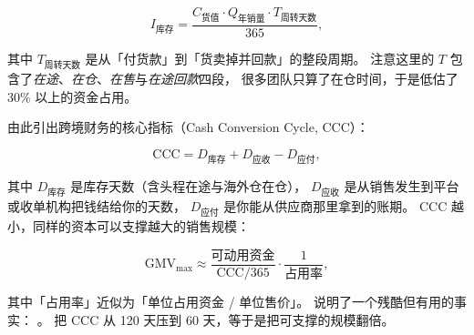 \begin{equation}
I_{\text{库存}} = \frac{C_{\text{货值}} \cdot Q_{\text{年销量}} \cdot T_{\text{周转天数}}}{365} ,
\label{eq:cbec-inventory}
\end{equation}

其中 $T_{\text{周转天数}}$ 是从「付货款」到「货卖掉并回款」的整段周期。
注意这里的 $T$ 包含了\emph{在途}、\emph{在仓}、\emph{在售}与\emph{在途回款}四段，
很多团队只算了在仓时间，于是低估了 30\% 以上的资金占用。

由此引出跨境财务的核心指标（Cash Conversion Cycle, CCC）：

\begin{equation}
\text{CCC} = D_{\text{库存}} + D_{\text{应收}} - D_{\text{应付}} ,
\label{eq:cbec-ccc}
\end{equation}

其中 $D_{\text{库存}}$ 是库存天数（含头程在途与海外仓在仓），
$D_{\text{应收}}$ 是从销售发生到平台或收单机构把钱结给你的天数，
$D_{\text{应付}}$ 是你能从供应商那里拿到的账期。
CCC 越小，同样的资本可以支撑越大的销售规模：

\begin{equation}
\text{GMV}_{\max} \approx \frac{\text{可动用资金}}{\text{CCC}/365} \cdot \frac{1}{\text{占用率}},
\label{eq:cbec-gmvmax}
\end{equation}

其中「占用率」近似为「单位占用资金 / 单位售价」。
 说明了一个残酷但有用的事实：
。
把 CCC 从 120 天压到 60 天，等于是把可支撑的规模翻倍。

